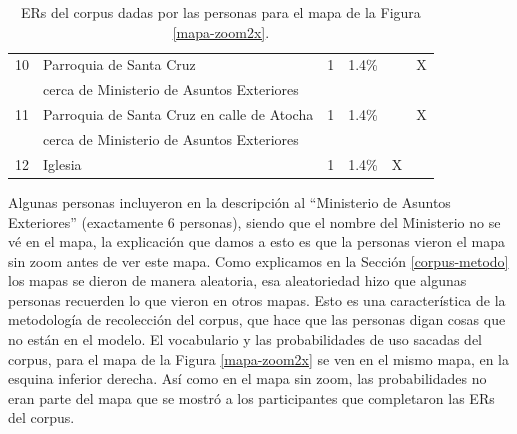 \begin{table}[H]
{\begin{center}
\begin{tabular}{|l|l|c|c|c|c|}
10&Parroquia de Santa Cruz  				   &    1 &	1.4\%	&&X\\  
&cerca de Ministerio de Asuntos Exteriores		   &	  &		&&\\  \hline
11&Parroquia de Santa Cruz en calle de Atocha  		   &	1 &	1.4\%	&&X\\  
&cerca de Ministerio de Asuntos Exteriores		   &	  &		&&\\  \hline
12&Iglesia						   &    1 &	1.4\%	&X&\\  \hline
\end{tabular}
\caption{ERs del corpus dadas por las personas para el mapa de la Figura \ref{mapa-zoom2x}.}\label{freq-mapa-zoom2x}
\end{center}
}
\end{table}


Algunas personas incluyeron en la descripci\'on al ``Ministerio de Asuntos Exteriores'' (exactamente 6 personas), siendo que el nombre del Ministerio no se v\'e en el mapa, la explicaci\'on que damos a esto es que la personas vieron el mapa sin zoom antes de ver este mapa. Como explicamos en la Secci\'on \ref{corpus-metodo} los mapas se dieron de manera aleatoria, esa aleatoriedad hizo que algunas personas recuerden lo que vieron en otros mapas. Esto es una caracter\'istica de la metodolog\'ia de recolecci\'on del corpus, que hace que las personas digan cosas que no est\'an en el modelo. 
El vocabulario y las probabilidades de uso sacadas del corpus, para el mapa de la Figura \ref{mapa-zoom2x} se ven en el mismo mapa, en la esquina inferior derecha. As\'i como en el mapa sin zoom, las probabilidades no eran parte del mapa que se mostr\'o a los participantes que completaron las ERs del corpus.

